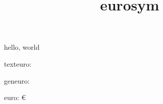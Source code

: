 \documentclass{amsart}
\title{eurosym}
\begin{document}
\maketitle

{\tt\meaning\umlauthigh}

hello, world

texteuro: \texteuro

geneuro: \geneuro

euro: \euro

\end{document}
